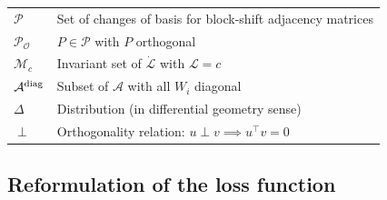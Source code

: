 \documentclass{article}
\newcommand{\1}{\mathds{1}}
\begin{document}
\begin{table}[h!]
\begin{tabular}{ll}
         $\mathcal{P}$ & Set of changes of basis for block-shift adjacency matrices \\
         $\mathcal{P_O}$ & $P\in \mathcal{P}$ with $ P$ orthogonal \\
         $ \mathcal{M}_c $ & Invariant set of $\dot{\mathcal{L}}$ with $\mathcal{L}=c$ \\
         $\mathcal{A}^{\rm diag} $ & Subset of $\mathcal{A}$ with all $W_i$ diagonal \\
         $\Delta$ & Distribution (in differential geometry sense)\\
         $\perp$ & Orthogonality relation: $u\perp v \implies u^\top v = 0$
    \end{tabular}
    \egroup
    \label{tab:symb-table}
\end{table}


\subsection{Reformulation of the loss function}
\label{app:loss-func}
\end{document}
